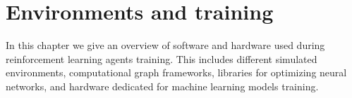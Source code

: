 \section{Environments and training}

In this chapter we give an overview of software and hardware used during reinforcement learning
agents training. This includes different simulated environments, computational graph frameworks,
libraries for optimizing neural networks, and hardware dedicated for machine learning models
training.




